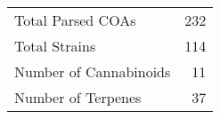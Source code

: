 \begin{tabular}{lr}
\toprule
Total Parsed COAs & 232 \\
Total Strains & 114 \\
Number of Cannabinoids & 11 \\
Number of Terpenes & 37 \\
\bottomrule
\end{tabular}
